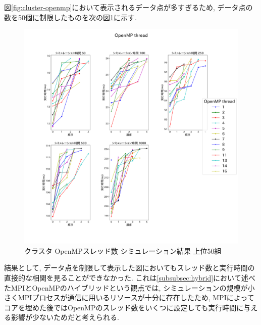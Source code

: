 図\ref{fig:cluster-openmp}において表示されるデータ点が多すぎるため,
データ点の数を50個に制限したものを次の図\ref{fig:cluster-openmp-top50}に示す.\\
\begin{figure}[htb]
\begin{center}
    \includegraphics[width=14cm]{./images/cluster-top50-OpenMP-thread.pdf}
    \caption{クラスタ OpenMPスレッド数 シミュレーション結果 上位50組}
    \label{fig:cluster-openmp-top50}
\end{center}
\end{figure}
\clearpage
結果として, データ点を制限して表示した図においてもスレッド数と実行時間の直接的な相関を見ることができなかった.
これは\ref{subsubsec:hybrid}において述べたMPIとOpenMPのハイブリッドという観点では,
シミュレーションの規模が小さくMPIプロセスが通信に用いるリソースが十分に存在したため,
MPIによってコアを埋めた後ではOpenMPのスレッド数をいくつに設定しても実行時間に与える影響が少ないためだと考えられる.\\
